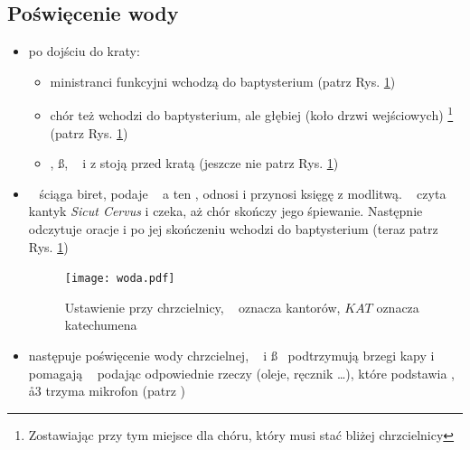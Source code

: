\subsection{Poświęcenie wody}
\begin{itemize}
	\item po dojściu do kraty:
	      \begin{itemize}
		      \item ministranci funkcyjni wchodzą do baptysterium (patrz Rys.
		            \ref{fig:woda})
		      \item chór też wchodzi do baptysterium, ale głębiej (koło drzwi
		            wejściowych) \footnote{Zostawiając przy tym miejsce dla
			            chóru, który musi stać bliżej chrzcielnicy} (patrz Rys.
		            \ref{fig:woda})
		      \item \ii, \ss, \dd~ i  z  stoją przed kratą (jeszcze nie
		            patrz Rys. \ref{fig:woda})
	      \end{itemize}
	\item \ii~ ściąga biret, podaje \dd~ a ten ,  odnosi i przynosi
	      księgę z modlitwą. \ii~ czyta kantyk \textit{Sicut Cervus} i czeka, aż
	      chór skończy jego śpiewanie. Następnie odczytuje oracje
	       i po jej skończeniu wchodzi do baptysterium
	      (teraz patrz Rys. \ref{fig:woda})
	      \begin{figure}[h!]
		      \centering
		      \texttt{[image: woda.pdf]}
		      \caption{Ustawienie przy chrzcielnicy, \spiew~ oznacza kantorów,
			      $KAT$ oznacza katechumena}
		      \label{fig:woda}
	      \end{figure}
	\item następuje poświęcenie wody chrzcielnej, \dd~ i \ss~ podtrzymują brzegi
	      kapy i pomagają \ii~ podając odpowiednie rzeczy (oleje, ręcznik
	      \dots), które podstawia , \aa3 trzyma mikrofon  (patrz
	      \textit{})
\end{itemize}
